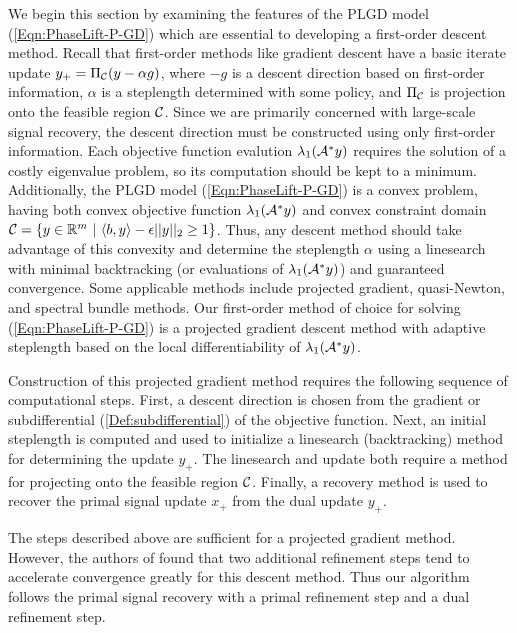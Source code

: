 We begin this section by examining the features of the PLGD model (\ref{Eqn:PhaseLift-P-GD}) which are essential to developing a first-order descent method.  
Recall that first-order methods like gradient descent have a basic iterate update $y_+ = \Pi_{\mathcal C}(y - \alpha g)$, where $-g$ is a descent direction based on first-order information, $\alpha$ is a steplength determined with some policy, and $\Pi_{\mathcal C}$ is projection onto the feasible region ${\mathcal C}$.  
Since we are primarily concerned with large-scale signal recovery, the descent direction must be constructed using only first-order information.  
Each objective function evalution $\lambda_1({\mathcal A}^*y)$ requires the solution of a costly eigenvalue problem, so its computation should be kept to a minimum.  
Additionally, the PLGD model (\ref{Eqn:PhaseLift-P-GD}) is a convex problem, having both convex objective function $\lambda_1({\mathcal A}^* y)$ and convex constraint domain ${\mathcal C} = \{ y \in \mathbb{R}^m \ | \ \langle b, y \rangle - \epsilon ||y||_2 \geq 1 \}$.   
Thus, any descent method should take advantage of this convexity and determine the steplength $\alpha$ using a linesearch with minimal backtracking (or evaluations of $\lambda_1({\mathcal A}^*y)$) and guaranteed convergence.  
Some applicable methods include projected gradient, quasi-Newton, and spectral bundle methods.  
Our first-order method of choice for solving (\ref{Eqn:PhaseLift-P-GD}) is a projected gradient descent method with adaptive steplength based on the local differentiability of $\lambda_1({\mathcal A}^* y)$.




Construction of this projected gradient method requires the following sequence of computational steps.  First, a descent direction is chosen from the gradient or subdifferential (\ref{Def:subdifferential}) of the objective function.  Next, an initial steplength is computed and used to initialize a linesearch (backtracking) method for determining the update $y_+$.  The linesearch and update both require a method for projecting onto the feasible region ${\mathcal C}$.  Finally, a recovery method is used to recover the primal signal update $x_+$ from the dual update $y_+$.

The steps described above are sufficient for a projected gradient method.  However, the authors of \cite{DBLP:journals/siamsc/FriedlanderM16} found that two additional refinement steps tend to accelerate convergence greatly for this descent method.  Thus our algorithm follows the primal signal recovery with a primal refinement step and a dual refinement step.




